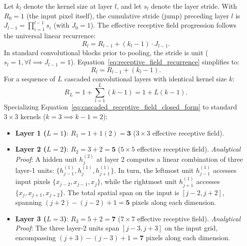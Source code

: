 Let $k_l$ denote the kernel size at layer $l$, and let $s_l$ denote the layer stride. With $R_0 = 1$ (the input pixel itself), the cumulative stride (jump) preceding layer $l$ is $J_{l-1} = \prod_{i=1}^{l-1} s_i$ (with $J_0 = 1$). The effective receptive field progression follows the universal linear recurrence:
\begin{equation}
R_l = R_{l-1} + (k_l - 1) \cdot J_{l-1}.
\label{eq:receptive_field_recurrence}
\end{equation}
In standard convolutional blocks prior to pooling, the stride is unit ($s_l = 1, \forall l \implies J_{l-1} = 1$). Equation~\eqref{eq:receptive_field_recurrence} simplifies to:
\begin{equation}
R_l = R_{l-1} + (k_l - 1).
\label{eq:unit_stride_receptive_field}
\end{equation}
For a sequence of $L$ cascaded convolutional layers with identical kernel size $k$:
\begin{equation}
R_L = 1 + \sum_{l=1}^L (k - 1) = 1 + L(k - 1).
\label{eq:cascaded_receptive_field_closed_form}
\end{equation}
Specializing Equation~\eqref{eq:cascaded_receptive_field_closed_form} to standard $3 \times 3$ kernels ($k = 3 \implies k - 1 = 2$):
\begin{itemize}[leftmargin=*]
  \item \textbf{Layer 1 ($L=1$)}: $R_1 = 1 + 1(2) = \mathbf{3}$ ($3 \times 3$ effective receptive field).
  \item \textbf{Layer 2 ($L=2$)}: $R_2 = 3 + 2 = \mathbf{5}$ ($5 \times 5$ effective receptive field).  
    \textit{Analytical Proof}: A hidden unit $h_j^{(2)}$ at layer 2 computes a linear combination of three layer-1 units: $\{h_{j-1}^{(1)}, h_j^{(1)}, h_{j+1}^{(1)}\}$. In turn, the leftmost unit $h_{j-1}^{(1)}$ accesses input pixels $\{x_{j-2}, x_{j-1}, x_j\}$, while the rightmost unit $h_{j+1}^{(1)}$ accesses $\{x_j, x_{j+1}, x_{j+2}\}$. The total spatial span on the input is $[j-2, j+2]$, spanning $(j+2) - (j-2) + 1 = \mathbf{5}$ pixels along each dimension.
  \item \textbf{Layer 3 ($L=3$)}: $R_3 = 5 + 2 = \mathbf{7}$ ($7 \times 7$ effective receptive field).  
    \textit{Analytical Proof}: The three layer-2 units span $[j-3, j+3]$ on the input grid, encompassing $(j+3) - (j-3) + 1 = \mathbf{7}$ pixels along each dimension.
\end{itemize}

